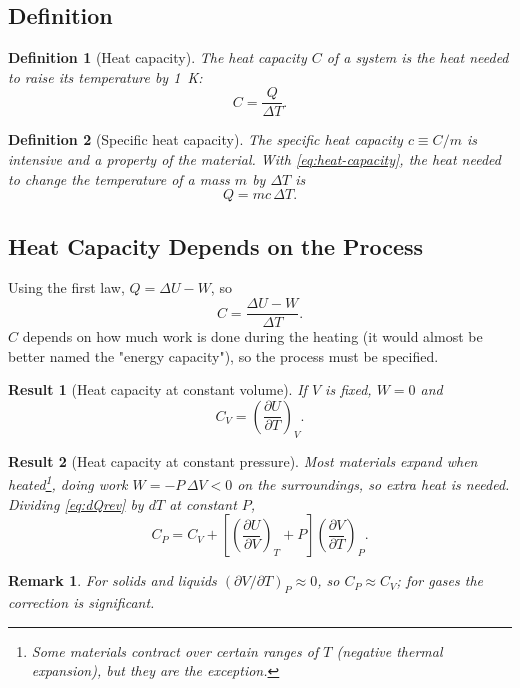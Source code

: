 \documentclass{article}
\newtheorem{definition}{Definition}
\newtheorem{remark}{Remark}
\newtheorem{result}{Result}
\begin{document}
\subsection{Definition}
\begin{definition}[Heat capacity]
    The heat capacity $C$ of a system is the heat needed to raise its temperature by \SI{1}{\kelvin}:
    \begin{equation}
        \label{eq:heat-capacity}
        C = \frac{Q}{\Delta T}.
    \end{equation}
\end{definition}
\begin{definition}[Specific heat capacity]
    The specific heat capacity $c \equiv C/m$ is intensive and a property of the material. With \eqref{eq:heat-capacity}, the heat needed to change the temperature of a mass $m$ by $\Delta T$ is
    \begin{equation}
        \label{eq:mcdT}
        Q = mc\,\Delta T.
    \end{equation}
\end{definition}

\subsection{Heat Capacity Depends on the Process}
Using the first law, $Q = \Delta U - W$, so
\[C = \frac{\Delta U - W}{\Delta T}.\]
$C$ depends on how much work is done during the heating (it would almost be better named the "energy capacity"), so the process must be specified.

\begin{result}[Heat capacity at constant volume]
    If $V$ is fixed, $W = 0$ and
    \[C_V = \left(\frac{\partial U}{\partial T}\right)_V.\]
\end{result}
\begin{result}[Heat capacity at constant pressure]
    Most materials expand when heated\footnote{Some materials contract over certain ranges of $T$ (negative thermal expansion), but they are the exception.}, doing work $W = -P\,\Delta V < 0$ on the surroundings, so extra heat is needed. Dividing \eqref{eq:dQrev} by $dT$ at constant $P$,
    \begin{equation}
        C_P = C_V + \left[\left(\frac{\partial U}{\partial V}\right)_T + P\right]\left(\frac{\partial V}{\partial T}\right)_P.
    \end{equation}
\end{result}

\begin{remark}
    For solids and liquids $(\partial V/\partial T)_P \approx 0$, so $C_P \approx C_V$; for gases the correction is significant.
\end{remark}
\end{document}
